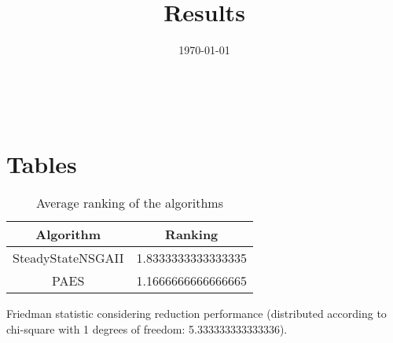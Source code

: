 \documentclass{article}
\title{Results}
\author{}
\date{\today}
\begin{document}
\oddsidemargin 0in \topmargin 0in\maketitle
\
\section{Tables}
\begin{table}[!htp]
\centering
\caption{Average ranking of the algorithms}
\begin{tabular}{c|c}
Algorithm&Ranking\\
\hline
SteadyStateNSGAII&1.8333333333333335\\
PAES&1.1666666666666665\\
\end{tabular}
\end{table}


Friedman statistic considering reduction performance (distributed according to chi-square with 1 degrees of freedom: 5.333333333333336).
\end{document}
